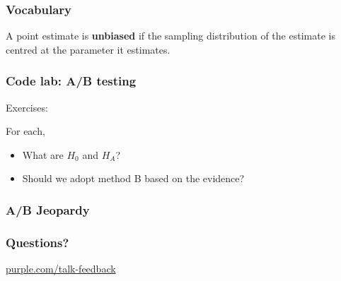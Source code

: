 \begin{frame}
  \frametitle{Vocabulary}

  A point estimate is \textbf{unbiased} if the sampling distribution
  of the estimate is centred at the parameter it estimates.


\end{frame}

\begin{frame}
  \frametitle{Code lab: A/B testing}

  Exercises:

  For each,
  \begin{itemize}
  \item What are $H_0$ and $H_A$?
  \item Should we adopt method B based on the evidence?
  \end{itemize}

  \cnote {
    
  }
\end{frame}

\begin{frame}
  \frametitle{A/B Jeopardy}

\end{frame}

\begin{frame}
  \frametitle{Questions?}
  \vspace{3cm}
  \centerline{\large\url{purple.com/talk-feedback}}
\end{frame}



